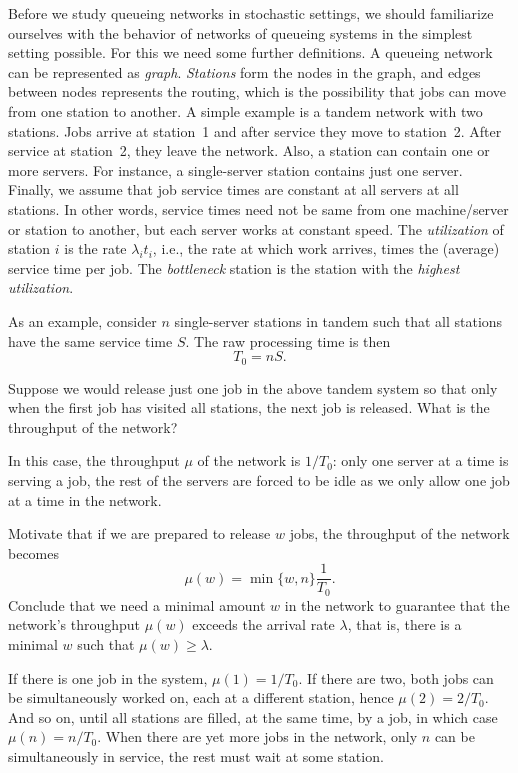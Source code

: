 Before we study queueing networks in stochastic settings, we should
familiarize ourselves with the behavior of networks of queueing
systems in the simplest setting possible.  For this we need some
further definitions. A queueing network can be represented as
\emph{graph}. \emph{Stations} form the nodes in the graph, and edges
between nodes represents the routing, which  is  the possibility that jobs can move from
one station to another. A simple example is a tandem network with two
stations. Jobs arrive at station~1 and after service they move to
station~2. After service at station~2, they leave the network. Also, a
station can contain one or more servers. For instance, a single-server
station contains just one server. Finally, we assume that job service
times are constant at all servers at all stations. In other words,
service times need not be same from one machine/server or station
to another, but each server works at constant speed.  The
\emph{utilization} of station $i$ is the rate $\lambda_i t_i$, i.e.,
the rate at which work arrives, times the (average) service time per
job. The \emph{bottleneck} station is the station with the
\emph{highest utilization}.

As an example, consider $n$ single-server stations in tandem such that
all stations have the same service time $S$.   The raw processing time  is then
\begin{equation}\label{eq:t0}
T_0= n S.
\end{equation}


\begin{exercise}
Suppose we would release just one job in the above tandem system so that only when the first job has visited all stations, the next job is released. What is the throughput of the network?
\begin{solution}
In this case, the throughput $\mu$ of the network is $1/T_0$: only one server at a time is serving a job, the rest of the servers are forced to be idle as we only allow one job at a time in the network. 
\end{solution}
\end{exercise}

\begin{exercise}
Motivate that if we are prepared to release $w$ jobs, the throughput of the network becomes
\begin{equation*}
  \mu(w) = \min\{w, n\} \frac 1{T_0}.
\end{equation*}
Conclude that we need a minimal amount $w$ in the network to guarantee that
the network's throughput $\mu(w)$ exceeds the arrival rate $\lambda$, that is, there is a minimal $w$ such that $\mu(w) \geq \lambda$.
\begin{solution}
If there is one job in the system, $\mu(1) = 1/T_0$. If there are two, both jobs can be simultaneously worked on, each at  a different station, hence $\mu(2)=2/T_0$. And so on, until all stations are filled, at the same time, by a job, in which case $\mu(n) = n/T_0$. When there are yet more jobs in the network, only $n$ can be simultaneously in service, the rest must wait at some station.
\end{solution}
\end{exercise}


